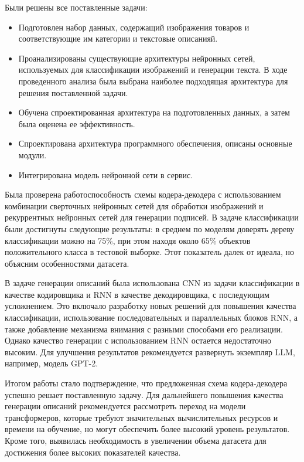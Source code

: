 \documentclass[a4paper,12pt]{extarticle}
\begin{document}
Были решены все поставленные задачи:
\begin{itemize}
	\item Подготовлен набор данных, содержащий изображения товаров и соответствующие им категории и текстовые описанияй.
	\item Проанализированы существующие архитектуры нейронных сетей, используемых для классификации изображений и генерации текста. В ходе проведенного анализа была выбрана наиболее подходящая архитектура для решения поставленной задачи.
	\item Обучена спроектированная архитектура на подготовленных данных, а затем была оценена ее эффективность.
	\item Спроектирована архитектура программного обеспечения, описаны основные модули.
	\item Интегрирована модель нейронной сети в сервис.
\end{itemize}

Была проверена работоспособность схемы кодера-декодера с использованием комбинации сверточных нейронных сетей для обработки изображений и рекуррентных нейронных сетей для генерации подписей. В задаче классификации были достигнуты следующие результаты: в среднем по моделям доверять дереву классификации можно на 75\%, при этом находя около 65\% объектов положительного класса в тестовой выборке. Этот показатель далек от идеала, но объясним особенностями датасета.

В задаче генерации описаний была использована CNN из задачи классификации в качестве кодировщика и RNN в качестве декодировщика, с последующим усложнением. Это включало разработку новых решений для повышения качества классификации, использование последовательных и параллельных блоков RNN, а также добавление механизма внимания с разными способами его реализации. Однако качество генерации с использованием RNN остается недостаточно высоким. Для улучшения результатов рекомендуется развернуть экземпляр LLM, например, модель GPT-2.

Итогом работы стало подтверждение, что предложенная схема кодера-декодера успешно решает поставленную задачу. Для дальнейшего повышения качества генерации описаний рекомендуется рассмотреть переход на модели трансформеров, которые требуют значительных вычислительных ресурсов и времени на обучение, но могут обеспечить более высокий уровень результатов. Кроме того, выявилась необходимость в увеличении объема датасета для достижения более высоких показателей качества.
\end{document}
